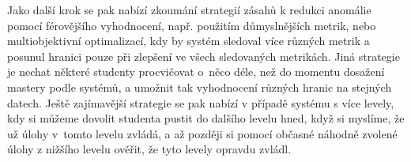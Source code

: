 \documentclass[twocolumn,10pt,cleanfoot]{asme2ej}
\begin{document}
Jako další krok se pak nabízí zkoumání strategií zásahů k redukci anomálie pomocí férovějšího vyhodnocení, např. použitím důmyslnějších metrik, nebo multiobjektivní optimalizací, kdy by systém sledoval více různých metrik a posunul hranici pouze při zlepšení ve všech sledovaných metrikách. Jiná strategie je nechat některé studenty procvičovat o~něco déle, než do momentu dosažení mastery podle systémů, a umožnit tak vyhodnocení různých hranic na stejných datech. Ještě zajímavější strategie se pak nabízí v případě systému s více levely, kdy si můžeme dovolit studenta pustit do dalšího levelu hned, když si myslíme, že už úlohy v~tomto levelu zvládá, a až později si pomocí občasné náhodně zvolené úlohy z nižšího levelu ověřit, že tyto levely opravdu zvládl.


\printbibliography[heading=bibintoc]
\end{document}
